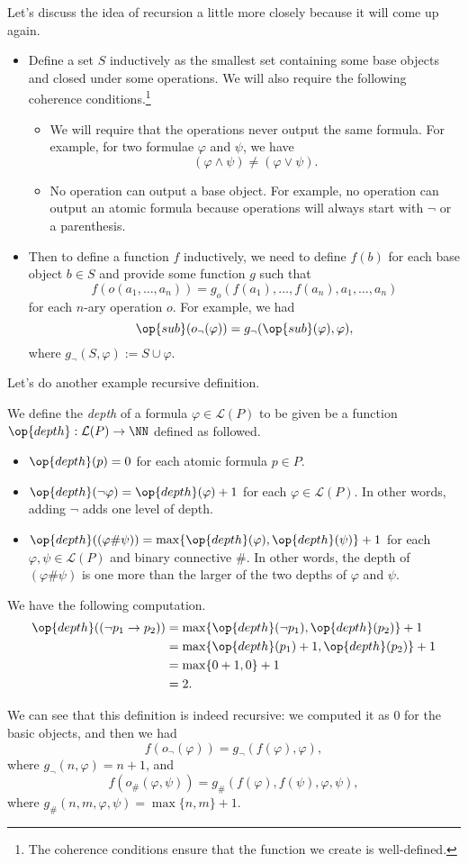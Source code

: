 Let's discuss the idea of recursion a little more closely because it will come up again.
\begin{itemize}
	\item Define a set $S$ inductively as the smallest set containing some base objects and closed under some operations. We will also require the following coherence conditions.\footnote{The coherence conditions ensure that the function we create is well-defined.}
	\begin{itemize}
		\item We will require that the operations never output the same formula. For example, for two formulae $\varphi$ and $\psi$, we have
		\[(\varphi\land\psi)\ne(\varphi\lor\psi).\]
		\item No operation can output a base object. For example, no operation can output an atomic formula because operations will always start with $\lnot$ or a parenthesis.
	\end{itemize}
	\item Then to define a function $f$ inductively, we need to define $f(b)$ for each base object $b\in S$ and provide some function $g$ such that
	\[f(o(a_1,\ldots,a_n))=g_o(f(a_1),\ldots,f(a_n),a_1,\ldots,a_n)\]
	for each $n$-ary operation $o$. For example, we had
	\[\op{sub}(o_\lnot(\varphi))=g_\lnot(\op{sub}(\varphi),\varphi),\]
	where $g_\lnot(S,\varphi):=S\cup\varphi$.
\end{itemize}
Let's do another example recursive definition.
\begin{definition}[Depth]
	We define the \textit{depth} of a formula $\varphi\in\mathcal L(P)$ to be given be a function $\op{depth}:\mathcal L(P)\to\NN$ defined as followed.
	\begin{itemize}
		\item $\op{depth}(p)=0$ for each atomic formula $p\in P$.
		\item $\op{depth}(\lnot\varphi)=\op{depth}(\varphi)+1$ for each $\varphi\in\mathcal L(P)$. In other words, adding $\lnot$ adds one level of depth.
		\item $\op{depth}((\varphi\#\psi))=\max\{\op{depth}(\varphi),\op{depth}(\psi)\}+1$ for each $\varphi,\psi\in\mathcal L(P)$ and binary connective $\#$. In other words, the depth of $(\varphi\#\psi)$ is one more than the larger of the two depths of $\varphi$ and $\psi$.
	\end{itemize}
\end{definition}
\begin{example}
	We have the following computation.
	\begin{align*}
		\op{depth}((\lnot p_1\to p_2)) &= \max\{\op{depth}(\lnot p_1),\op{depth}(p_2)\}+1 \\
		&= \max\{\op{depth}(p_1)+1,\op{depth}(p_2)\}+1 \\
		&= \max\{0+1,0\}+1 \\
		&= 2.
	\end{align*}
\end{example}
We can see that this definition is indeed recursive: we computed it as $0$ for the basic objects, and then we had
\[f(o_\lnot(\varphi))=g_\lnot(f(\varphi),\varphi),\]
where $g_\lnot(n,\varphi)=n+1$, and
\[f(o_\#(\varphi,\psi))=g_\#(f(\varphi),f(\psi),\varphi,\psi),\]
where $g_\#(n,m,\varphi,\psi)=\max\{n,m\}+1$.